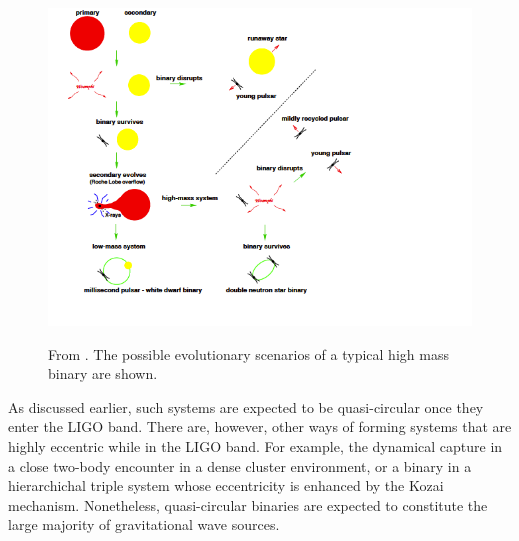 \begin{figure}[!ht]
\includegraphics[scale=0.95]{intro/BinaryEvolution.png}
\label{fig_BinaryEvolution}
\caption[Evolutionary scenarios of a typical high-mass binary.]{From \cite{Lorimer2008}. The possible evolutionary scenarios of a typical high mass binary are shown.}
\end{figure}

As discussed earlier, such systems are expected to be quasi-circular once they enter the LIGO band. There are, however, other ways of forming systems that are highly eccentric while in the LIGO band. For example, the dynamical capture in a close two-body encounter in a dense cluster environment, or a binary in a hierarchichal triple system whose eccentricity is enhanced by the Kozai mechanism. Nonetheless, quasi-circular binaries are expected to constitute the large majority of gravitational wave sources.

